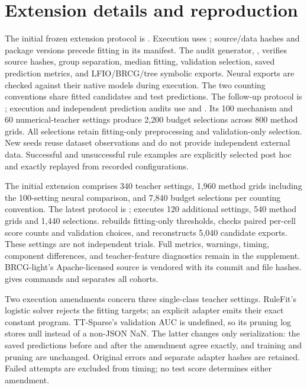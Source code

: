 \documentclass[a4paper,fleqn,review]{cas-sc}
\newcommand{\kbsbarrier}{\FloatBarrier}
\newcommand{\kbsbarrier}{}
\begin{document}
\appendix
\section{Extension details and reproduction}\label{app:extension}


The initial frozen extension protocol is . Execution uses ; source/data hashes and package versions precede fitting in its manifest. The audit generator, , verifies source hashes, group separation, median fitting, validation selection, saved prediction metrics, and LFIO/BRCG/tree symbolic exports. Neural exports are checked against their native models during execution. The two counting conventions share fitted candidates and test predictions. The follow-up protocol is ; execution and independent prediction audits use  and . Its 100 mechanism and 60 numerical-teacher settings produce 2,200 budget selections across 800 method grids. All selections retain fitting-only preprocessing and validation-only selection. New seeds reuse dataset observations and do not provide independent external data. Successful and unsuccessful rule examples are explicitly selected post hoc and exactly replayed from recorded configurations.

The initial extension comprises 340 teacher settings, 1,960 method grids including the 100-setting neural comparison, and 7,840 budget selections per counting convention. The latest protocol is ;  executes 120 additional settings, 540 method grids and 1,440 selections.  rebuilds fitting-only thresholds, checks paired per-cell score counts and validation choices, and reconstructs 5,040 candidate exports. These settings are not independent trials. Full metrics, warnings, timing, component differences, and teacher-feature diagnostics remain in the supplement. BRCG-light's Apache-licensed source is vendored with its commit and file hashes.  gives commands and separates all cohorts.

Two execution amendments concern three single-class teacher settings. RuleFit's logistic solver rejects the fitting targets; an explicit adapter emits their exact constant program. TT-Sparse's validation AUC is undefined, so its pruning log stores null instead of a non-JSON NaN. The latter changes only serialization: the saved predictions before and after the amendment agree exactly, and training and pruning are unchanged. Original errors and separate adapter hashes are retained. Failed attempts are excluded from timing; no test score determines either amendment.
\kbsbarrier
\end{document}

